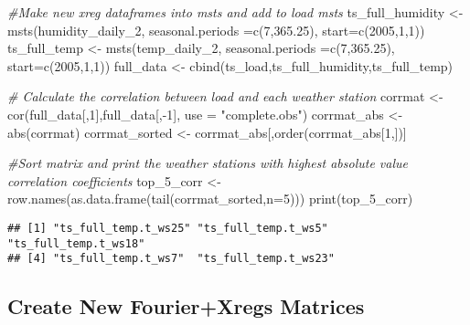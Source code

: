 \documentclass[
]{article}
\newenvironment{Shaded}{\begin{snugshade}}{\end{snugshade}}
\newcommand{\AttributeTok}[1]{\textcolor[rgb]{0.77,0.63,0.00}{#1}}
\newcommand{\CommentTok}[1]{\textcolor[rgb]{0.56,0.35,0.01}{\textit{#1}}}
\newcommand{\DecValTok}[1]{\textcolor[rgb]{0.00,0.00,0.81}{#1}}
\newcommand{\FloatTok}[1]{\textcolor[rgb]{0.00,0.00,0.81}{#1}}
\newcommand{\FunctionTok}[1]{\textcolor[rgb]{0.00,0.00,0.00}{#1}}
\newcommand{\NormalTok}[1]{#1}
\newcommand{\OtherTok}[1]{\textcolor[rgb]{0.56,0.35,0.01}{#1}}
\newcommand{\SpecialCharTok}[1]{\textcolor[rgb]{0.00,0.00,0.00}{#1}}
\newcommand{\StringTok}[1]{\textcolor[rgb]{0.31,0.60,0.02}{#1}}
\begin{document}
\begin{Shaded}
\begin{Highlighting}[]
\CommentTok{\#Make new xreg dataframes into msts and add to load msts}
\NormalTok{ts\_full\_humidity }\OtherTok{\textless{}{-}} \FunctionTok{msts}\NormalTok{(humidity\_daily\_2, }
                           \AttributeTok{seasonal.periods =}\FunctionTok{c}\NormalTok{(}\DecValTok{7}\NormalTok{,}\FloatTok{365.25}\NormalTok{),}
                           \AttributeTok{start=}\FunctionTok{c}\NormalTok{(}\DecValTok{2005}\NormalTok{,}\DecValTok{1}\NormalTok{,}\DecValTok{1}\NormalTok{))}
\NormalTok{ts\_full\_temp }\OtherTok{\textless{}{-}} \FunctionTok{msts}\NormalTok{(temp\_daily\_2, }
                           \AttributeTok{seasonal.periods =}\FunctionTok{c}\NormalTok{(}\DecValTok{7}\NormalTok{,}\FloatTok{365.25}\NormalTok{),}
                           \AttributeTok{start=}\FunctionTok{c}\NormalTok{(}\DecValTok{2005}\NormalTok{,}\DecValTok{1}\NormalTok{,}\DecValTok{1}\NormalTok{))}
\NormalTok{full\_data }\OtherTok{\textless{}{-}} \FunctionTok{cbind}\NormalTok{(ts\_load,ts\_full\_humidity,ts\_full\_temp)}

\CommentTok{\# Calculate the correlation between load and each weather station}
\NormalTok{corrmat }\OtherTok{\textless{}{-}} \FunctionTok{cor}\NormalTok{(full\_data[,}\DecValTok{1}\NormalTok{],full\_data[,}\SpecialCharTok{{-}}\DecValTok{1}\NormalTok{], }\AttributeTok{use =} \StringTok{"complete.obs"}\NormalTok{)}
\NormalTok{corrmat\_abs }\OtherTok{\textless{}{-}} \FunctionTok{abs}\NormalTok{(corrmat)}
\NormalTok{corrmat\_sorted }\OtherTok{\textless{}{-}}\NormalTok{ corrmat\_abs[,}\FunctionTok{order}\NormalTok{(corrmat\_abs[}\DecValTok{1}\NormalTok{,])]}

\CommentTok{\#Sort matrix and print the weather stations with highest absolute value correlation coefficients}
\NormalTok{top\_5\_corr }\OtherTok{\textless{}{-}} \FunctionTok{row.names}\NormalTok{(}\FunctionTok{as.data.frame}\NormalTok{(}\FunctionTok{tail}\NormalTok{(corrmat\_sorted,}\AttributeTok{n=}\DecValTok{5}\NormalTok{)))}
\FunctionTok{print}\NormalTok{(top\_5\_corr)}
\end{Highlighting}
\end{Shaded}

\begin{verbatim}
## [1] "ts_full_temp.t_ws25" "ts_full_temp.t_ws5"  "ts_full_temp.t_ws18"
## [4] "ts_full_temp.t_ws7"  "ts_full_temp.t_ws23"
\end{verbatim}

\hypertarget{create-new-fourierxregs-matrices}{%
\subsection{Create New Fourier+Xregs
Matrices}\label{create-new-fourierxregs-matrices}}
\end{document}
